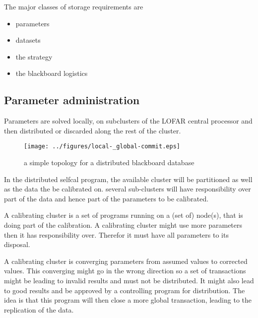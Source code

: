 \documentclass[]{lofar}
\begin{document}
    The major classes of storage requirements are

    \begin{itemize}

      \item 

        parameters

      \item 

        datasets

      \item 

        the strategy

      \item 

        the blackboard logistics

    \end{itemize}

    \subsection{Parameter administration}
    \label{id2720046}\hypertarget{id2720046}{}%

      Parameters are solved locally, on subclusters of the LOFAR
      central processor and then distributed or discarded along the
      rest of the cluster.

      \begin{figure}
        \texttt{[image: ../figures/local-\_global-commit.eps]}
        \hypertarget{figure-localGlobalCommit}{}
        \caption{a simple topology for a distributed blackboard database\label{figure-localGlobalCommit}}
      \end{figure}

      In the distributed selfcal program, the available cluster will
      be partitioned as well as the data the be calibrated on. several
      sub-clusters will have responsibility over part of the data and
      hence part of the parameters to be calibrated.

      A calibrating cluster is a set of programs running on a (set of)
      node(s), that is doing part of the calibration.  A calibrating
      cluster might use more parameters then it has responsibility
      over. Therefor it must have all parameters to its disposal.

      A calibrating cluster is converging parameters from assumed
      values to corrected values. This converging might go in the
      wrong direction so a set of transactions might be leading to
      invalid results and must not be distributed. It might also lead
      to good results and be approved by a controlling program for
      distribution. The idea is that this program will then close a
      more global transaction, leading to the replication of the data.
\end{document}
